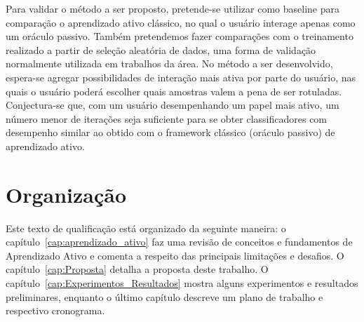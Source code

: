 Para validar o método a ser proposto, pretende-se utilizar como baseline para comparação o aprendizado ativo clássico, no qual o usuário interage apenas como um oráculo passivo. Também pretendemos fazer comparações com o treinamento realizado a partir de seleção aleatória de dados, uma forma de validação normalmente utilizada em trabalhos da área. No método a ser desenvolvido, espera-se agregar possibilidades de interação mais ativa por parte do usuário, nas quais o usuário poderá escolher quais amostras valem a pena de ser rotuladas. Conjectura-se que, com um usuário desempenhando um papel mais ativo, um número menor de iterações seja suficiente para se obter classificadores com desempenho similar ao obtido com o framework clássico (oráculo passivo) de aprendizado ativo.




\section{Organização}
\label{sec:intro_organizacao}

Este texto de qualificação está organizado da seguinte maneira: o capítulo~\ref{cap:aprendizado_ativo} faz uma revisão de conceitos e fundamentos de Aprendizado Ativo e comenta a respeito das principais limitações e desafios. O capítulo~\ref{cap:Proposta} detalha a proposta deste trabalho. O capítulo~\ref{cap:Experimentos_Resultados} mostra alguns experimentos e resultados preliminares, enquanto o último capítulo descreve um plano de trabalho e respectivo cronograma.